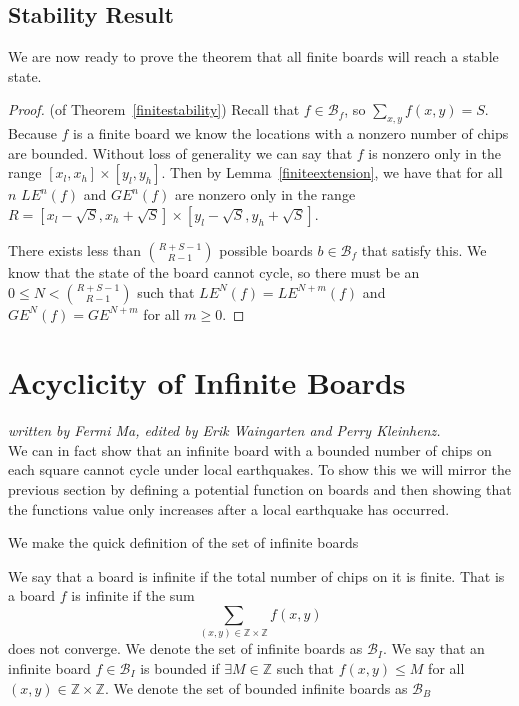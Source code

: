 \documentclass[runningheads,a4paper]{llncs}
\begin{document}
\subsection{Stability Result}
We are now ready to prove the theorem that all finite boards will reach a stable state. 

\begin{proof}
(of Theorem~\ref{finitestability}) Recall that $f \in \mathcal{B}_f$, so $\sum_{x,y} f(x,y) = S$. Because $f$ is a finite board we know the locations with a nonzero number of chips are bounded.  Without loss of generality we can say that $f$ is nonzero only in the range $[x_l, x_h] \times [y_l, y_h]$. Then by Lemma~\ref{finiteextension}, we have that for all $n$ $LE^n(f)$ and $GE^n(f)$ are nonzero only in the range $R = [x_l - \sqrt{S}, x_h + \sqrt{S}] \times [y_l - \sqrt{S}, y_h + \sqrt{S}]$. 

There exists less than $\binom{R+S-1}{R-1}$ possible boards $b \in \mathcal{B}_f$ that satisfy this. We know that the state of the board cannot cycle, so there must be an $0 \leq N <\binom{R+S-1}{R-1}$ such that $LE^N(f) = LE^{N+m}(f)$ and $GE^N(f)=GE^{N+m}$ for all $m \geq 0$.
\end{proof}

\section{Acyclicity of Infinite Boards}
\label{Acyclicity of Infinite Boards}

\emph{written by Fermi Ma, edited by Erik Waingarten and Perry Kleinhenz.}\\

We can in fact show that an infinite board with a bounded number of chips on each square cannot cycle under local earthquakes. To show this we will mirror the previous section by defining a potential function on boards and then showing that the functions value only increases after a local earthquake has occurred.

We make the quick definition of the set of infinite boards
\begin{definition}
We say that a board is infinite if the total number of chips on it is finite. That is a board $f$ is infinite if the sum 
\begin{equation*}
 \sum_{(x,y) \in \mathbb{Z} \times \mathbb{Z}} f(x,y)
\end{equation*}
does not converge. We denote the set of infinite boards as $\mathcal{B}_I$. We say that an infinite board $f \in \mathcal{B}_I$ is bounded if $\exists M \in \mathbb{Z}$ such that $f(x,y) \leq M$ for all $(x,y) \in \mathbb{Z} \times \mathbb{Z}$.  We denote the set of bounded infinite boards as $\mathcal{B}_B$
\end{definition}
\end{document}
